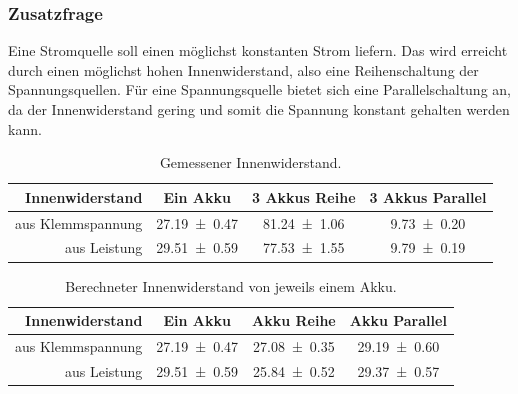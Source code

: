 \documentclass[
	a4paper,
	12pt,
	pagesize,
	ngerman
]{scrartcl}
\begin{document}
	\subsubsection*{Zusatzfrage}
	Eine Stromquelle soll einen möglichst konstanten Strom liefern. Das wird erreicht durch einen möglichst hohen Innenwiderstand, also eine Reihenschaltung der Spannungsquellen. Für eine Spannungsquelle bietet sich eine Parallelschaltung an, da der Innenwiderstand gering und somit die Spannung konstant gehalten werden kann.
	\begin{table}[tb]
		\centering
		\begin{tabular}{ r | c | c | c}
			Innenwiderstand& Ein Akku & 3 Akkus Reihe & 3 Akkus Parallel \\ \hline
			aus Klemmspannung& \SI{27,19 \pm 0,47 }{\Omega}& \SI{81,24 \pm 1,06 }{\Omega}&  \SI{9,73 \pm 0,20 }{\Omega} \\
			aus Leistung & \SI{29,51 \pm 0,59 }{\Omega}&  \SI{77,53 \pm 1,55 }{\Omega}&  \SI{9,79 \pm 0,19 }{\Omega}\\

		\end{tabular}
		\caption{Gemessener Innenwiderstand.}
		\label{Tabelle_Innenwiderstaende} 
	\end{table}
	\begin{table}[tb]
		\centering
		\begin{tabular}{ r | c | c | c}
			Innenwiderstand& Ein Akku & Akku Reihe & Akku Parallel \\ \hline
			aus Klemmspannung& \SI{27,19 \pm 0,47 }{\Omega}& \SI{27,08 \pm 0,35 }{\Omega}&  \SI{29,19 \pm 0,60 }{\Omega} \\
			aus Leistung & \SI{29,51 \pm 0,59 }{\Omega}&  \SI{25,84 \pm 0,52 }{\Omega}&  \SI{29,37 \pm 0,57 }{\Omega}\\

		\end{tabular}
		\caption{Berechneter Innenwiderstand von jeweils einem Akku.}
		\label{Tabelle_Innenwiderstaende2} 
	\end{table}
\end{document}
